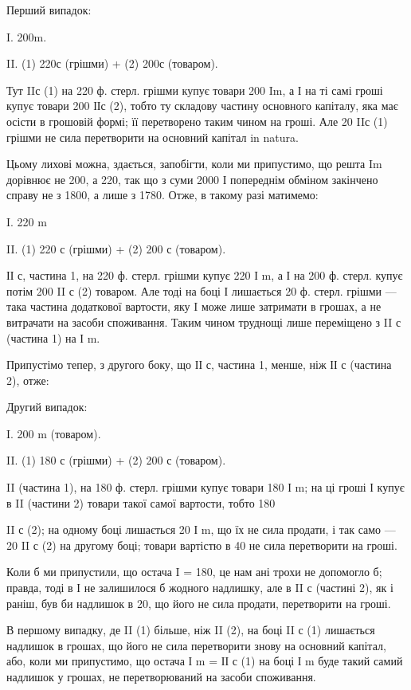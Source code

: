 Перший випадок:

I.    200m.

II. (1) 220с (грішми) + (2) 200с (товаром).

Тут IIс (1) на 220 ф. стерл. грішми купує товари 200 Im, а І на
ті самі гроші купує товари 200 ІІс (2), тобто ту складову частину
основного капіталу, яка має осісти в грошовій формі; її перетворено
таким чином на гроші. Але 20 IIс (1) грішми не сила перетворити на
основний капітал in natura.

Цьому лихові можна, здається, запобігти, коли ми припустимо, що решта
Im дорівнює не 200, а 220, так що з суми 2000 І попереднім обміном закінчено
справу не з 1800, а лише з 1780. Отже, в такому разі матимемо:

I.    220 m

II. (1) 220 с (грішми) + (2) 200 с (товаром).

ІІ с, частина 1, на 220 ф. стерл. грішми купує 220 І m, а І на
200 ф. стерл. купує потім 200 II с (2) товаром. Але тоді на боці І
лишається 20 ф. стерл. грішми — така частина додаткової вартости, яку
I може лише затримати в грошах, а не витрачати на засоби споживання.
Таким чином труднощі лише переміщено з II с (частина 1) на І m.

Припустімо тепер, з другого боку, що ІІ с, частина 1, менше, ніж ІІ с
(частина 2), отже:

Другий випадок:

I.    200 m (товаром).

II. (1) 180 с (грішми) + (2) 200 с (товаром).

II (частина 1), на 180 ф. стерл. грішми купує товари 180 І m; на ці
гроші І купує в II (частини 2) товари такої самої вартости, тобто 180

II    с (2); на одному боці лишається 20 І m, що їх не сила продати, і так
само — 20 II с (2) на другому боці; товари вартістю в 40 не сила перетворити
на гроші.

Коли б ми припустили, що остача I = 180, це нам ані трохи не допомогло
б; правда, тоді в І не залишилося б жодного надлишку, але в II с
(частині 2), як і раніш, був би надлишок в 20, що його не сила продати,
перетворити на гроші.

В першому випадку, де II (1) більше, ніж II (2), на боці II с (1)
лишається надлишок в грошах, що його не сила перетворити знову на
основний капітал, або, коли ми припустимо, що остача І m = ІІ с (1) на
боці І m буде такий самий надлишок у грошах, не перетворюваний на
засоби споживання.

